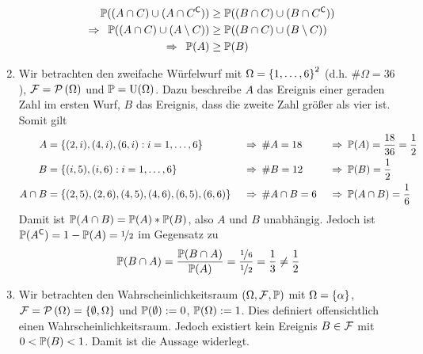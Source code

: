 \begin{exercisePage}
\begin{enumerate}[leftmargin=*, label=(zu \alph*)]
\begin{equation*}
\begin{aligned}
			\P((A \cap C) \cup (A \cap C^\complement)) &\geq \P( (B \cap C) \cup (B \cap C^\complement)) \\
			\follows \P((A \cap C) \cup (A \setminus C)) &\geq \P((B \cap C) \cup (B \setminus C)) \\
			\follows \P(A) &\geq \P(B)
			\end{aligned}
		\end{equation*}
		\item Wir betrachten den zweifache Würfelwurf mit $\Omega=\menge{1, \dots, 6}^2$ (d.h. $\# \Omega = 36$), $\ereignisF = \pows{\Omega}$ und $\P = \Uni(\Omega)$. Dazu beschreibe $A$ das Ereignis einer geraden Zahl im ersten Wurf, $B$ das Ereignis, dass die zweite Zahl größer als vier ist. Somit gilt
		\begin{equation*}
			\begin{aligned}
				A &= \menge{(2,i),(4,i),(6,i) : i = 1,\dots,6} & \follows &\# A = 18 &\follows &\P(A) = \frac{18}{36} = \frac{1}{2} \\
				B &= \menge{(i,5),(i,6) : i = 1,\dots, 6} &\follows &\# B = 12 &\follows &\P(B) = \frac{1}{2} \\
				A \cap B &= \menge{(2,5),(2,6),(4,5),(4,6),(6,5),(6,6)} &\follows &\# A \cap B = 6 &\follows &\P(A \cap B) = \frac{1}{6}
			\end{aligned}
		\end{equation*}
		Damit ist $\P(A \cap B) = \P(A) * \P(B)$, also $A$ und $B$ unabhängig. Jedoch ist $\P(A^\complement) = 1 - \P(A) = \lfrac{1}{2}$ im Gegensatz zu
		\begin{equation*}
			\P(B \cap A) = \frac{\P(B \cap A)}{\P(A)} = \frac{\lfrac{1}{6}}{\lfrac{1}{2}} = \frac{1}{3} \neq \frac{1}{2}
		\end{equation*}
		\item Wir betrachten den Wahrscheinlichkeitsraum $(\Omega, \ereignisF, \P)$ mit $\Omega = \menge{\alpha}$, $\ereignisF = \pows{\Omega} = \menge{\emptyset , \Omega}$ und $\P(\emptyset) \defeq 0$, $\P(\Omega) \defeq 1$. Dies definiert offensichtlich einen Wahrscheinlichkeitsraum. Jedoch existiert kein Ereignis $B \in \ereignisF$ mit $0 < \P(B) < 1$. Damit ist die Aussage widerlegt.
	\end{enumerate}
	

\end{exercisePage}
